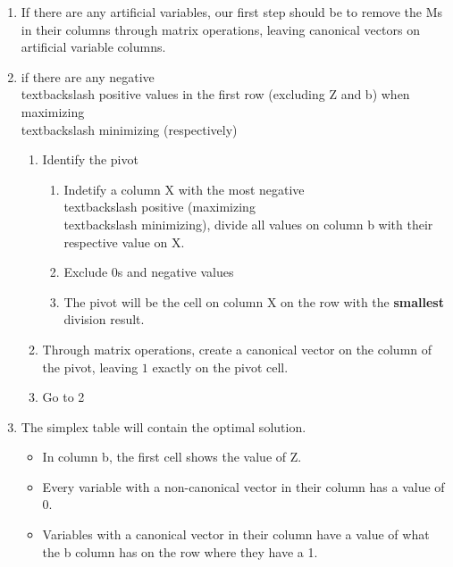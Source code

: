 \documentclass[12pt,a4paper]{article}
\begin{document}
\begin{enumerate}
    \item If there are any artificial variables, our first step should be to remove the Ms in their columns through matrix operations, leaving canonical vectors on artificial variable columns.
    \item if there are any negative\\textbackslash positive values in the first row (excluding Z and b) when maximizing\\textbackslash minimizing (respectively)
    \begin{enumerate}
        \item Identify the pivot
        \begin{enumerate}
            \item Indetify a column X with the most negative\\textbackslash positive (maximizing\\textbackslash minimizing), divide all values on column b with their respective value on X.
            \item Exclude 0s and negative values
            \item The pivot will be the cell on column X on the row with the \textbf{smallest} division result.
        \end{enumerate}
        \item Through matrix operations, create a canonical vector on the column of the pivot, leaving $1$ exactly on the pivot cell.
        \item Go to 2
    \end{enumerate}
    \item The simplex table will contain the optimal solution.
    \begin{itemize}
        \item In column b, the first cell shows the value of Z.
        \item Every variable with a non-canonical vector in their column has a value of 0.
        \item Variables with a canonical vector in their column have a value of what the b column has on the row where they have a 1.
    \end{itemize}
\end{enumerate}
\newpage
\end{document}
